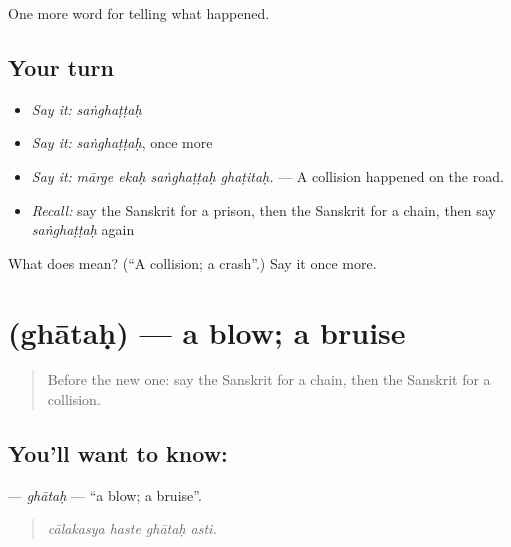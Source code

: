 \begin{grammarlens}[title={What you've built}]
One more word for telling what happened.
\end{grammarlens}

\subsection*{Your turn}
\begin{itemize}
\raggedright
  \item \emph{Say it:} \emph{saṅghaṭṭaḥ}
  \item \emph{Say it:} \emph{saṅghaṭṭaḥ}, once more
  \item \emph{Say it:} \emph{mārge ekaḥ saṅghaṭṭaḥ ghaṭitaḥ.} — A collision happened on the road.
  \item \emph{Recall:} say the Sanskrit for a prison, then the Sanskrit for a chain, then say \emph{saṅghaṭṭaḥ} again
\end{itemize}

\begin{tcolorbox}[breakable,colback=teal!4,colframe=teal!35!black,title={Before you move on}]
What does  mean? (\textquotedblleft{}A collision; a crash\textquotedblright{}.) Say it once more.
\end{tcolorbox}
\section[\texorpdfstring{\sk{घातः} (ghātaḥ)}{घातः (ghātaḥ)}]{ (ghātaḥ) — a blow; a bruise}

\label{lesson:SA-C294-ghatah}



\begin{quote}
Before the new one: say the Sanskrit for a chain, then the Sanskrit for a collision.
\end{quote}

\subsection*{You'll want to know: }
\textbf{} — \emph{ghātaḥ} — \textquotedblleft{}a blow; a bruise\textquotedblright{}.

\begin{quote}
   
\end{quote}

\begin{quote}
\emph{cālakasya haste ghātaḥ asti.}
\end{quote}

